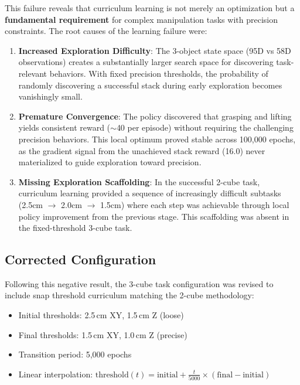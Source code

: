 \documentclass[12pt,a4paper,oneside]{report}
\begin{document}
This failure reveals that curriculum learning is not merely an optimization but a \textbf{fundamental requirement} for complex manipulation tasks with precision constraints. The root causes of the learning failure were:

\begin{enumerate}
    \item \textbf{Increased Exploration Difficulty}: The 3-object state space (95D vs 58D observations) creates a substantially larger search space for discovering task-relevant behaviors. With fixed precision thresholds, the probability of randomly discovering a successful stack during early exploration becomes vanishingly small.

    \item \textbf{Premature Convergence}: The policy discovered that grasping and lifting yields consistent reward ($\sim$40 per episode) without requiring the challenging precision behaviors. This local optimum proved stable across 100,000 epochs, as the gradient signal from the unachieved stack reward (16.0) never materialized to guide exploration toward precision.

    \item \textbf{Missing Exploration Scaffolding}: In the successful 2-cube task, curriculum learning provided a sequence of increasingly difficult subtasks (2.5cm $\rightarrow$ 2.0cm $\rightarrow$ 1.5cm) where each step was achievable through local policy improvement from the previous stage. This scaffolding was absent in the fixed-threshold 3-cube task.
\end{enumerate}

\subsection{Corrected Configuration}

Following this negative result, the 3-cube task configuration was revised to include snap threshold curriculum matching the 2-cube methodology:

\begin{itemize}
    \item Initial thresholds: 2.5\,cm XY, 1.5\,cm Z (loose)
    \item Final thresholds: 1.5\,cm XY, 1.0\,cm Z (precise)
    \item Transition period: 5,000 epochs
    \item Linear interpolation: $\text{threshold}(t) = \text{initial} + \frac{t}{5000} \times (\text{final} - \text{initial})$
\end{itemize}
\end{document}
